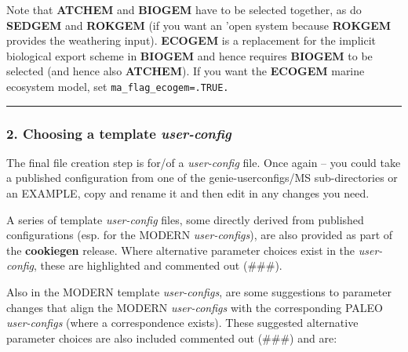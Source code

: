 \noindent Note that \textbf{ATCHEM} and \textbf{BIOGEM} have to be selected together, as do \textbf{SEDGEM} and \textbf{ROKGEM} (if you want an 'open system because \textbf{ROKGEM} provides the weathering input). \textbf{ECOGEM} is a replacement for the implicit biological export scheme in \textbf{BIOGEM} and hence requires \textbf{BIOGEM} to be selected (and hence also \textbf{ATCHEM}). If you want the \textbf{ECOGEM} marine ecosystem model, set \texttt{ma\_flag\_ecogem=.TRUE.}

\vspace{1mm}
\noindent\rule{4cm}{0.5pt}
\vspace{2mm}

\newpage 
%
\subsubsection{2. Choosing a template \textit{user-config}}

The final file creation step is for/of a \textit{user-config} file. Once again -- you could take a published configuration from one of the \textsf{\footnotesize genie-userconfigs/MS} sub-directories or an EXAMPLE, copy and rename it and then edit in any changes you need.

A series of template \textit{user-config} files, some directly derived from published configurations (esp. for the MODERN \textit{user-configs}), are also provided as part of the \textbf{cookiegen} release. Where alternative parameter choices exist in the \textit{user-config}, these are highlighted and commented out (\#\#\#).

Also in the MODERN template \textit{user-configs}, are some suggestions to parameter changes that align the MODERN \textit{user-configs} with the corresponding PALEO \textit{user-configs} (where a correspondence exists). These suggested alternative parameter choices are also included commented out (\#\#\#) and are:

